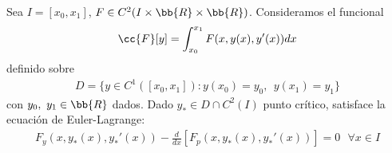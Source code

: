 \begin{teo} %
    Sea $I=[x_0, x_1]$, $F\in C^2(I\times \bb{R} \times \bb{R})$. Consideramos el funcional
    \begin{gather*}
        \cc{F}[y] = \int_{x_0}^{x_1} F(x, y(x), y'(x)) dx
    \end{gather*}
    definido sobre
    \begin{gather*}
        D = \{y \in C^1([x_0, x_1]) : y(x_0) =y_0,\ \ y(x_1) = y_1\}
    \end{gather*}
    con $y_0,\ y_1\in \bb{R}$ dados. Dado $y_*\in D\cap C^2(I)$ punto crítico, satisface la ecuación de Euler-Lagrange:
    \begin{gather*}
        F_y(x, y_*(x), y_*'(x)) - \frac{d}{dx} [ F_p(x, y_*(x), y_*'(x))] = 0 \ \ \ \forall x \in I
    \end{gather*}


\end{teo}
